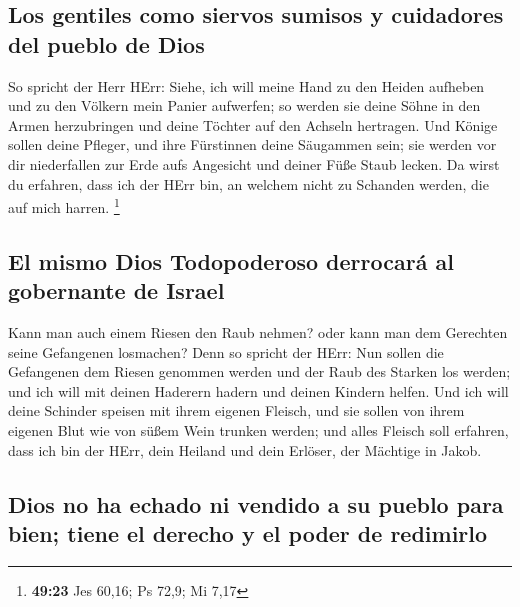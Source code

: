 \hypertarget{los-gentiles-como-siervos-sumisos-y-cuidadores-del-pueblo-de-dios}{%
\subsection{Los gentiles como siervos sumisos y cuidadores del pueblo de
Dios}\label{los-gentiles-como-siervos-sumisos-y-cuidadores-del-pueblo-de-dios}}

 So spricht der Herr HErr: Siehe, ich will meine Hand zu
den Heiden aufheben und zu den Völkern mein Panier aufwerfen; so werden
sie deine Söhne in den Armen herzubringen und deine Töchter auf den
Achseln hertragen.  Und Könige sollen deine Pfleger, und
ihre Fürstinnen deine Säugammen sein; sie werden vor dir niederfallen
zur Erde aufs Angesicht und deiner Füße Staub lecken. Da wirst du
erfahren, dass ich der HErr bin, an welchem nicht zu Schanden werden,
die auf mich harren. \footnote{\textbf{49:23} Jes 60,16; Ps 72,9; Mi
  7,17}

\hypertarget{el-mismo-dios-todopoderoso-derrocaruxe1-al-gobernante-de-israel}{%
\subsection{El mismo Dios Todopoderoso derrocará al gobernante de
Israel}\label{el-mismo-dios-todopoderoso-derrocaruxe1-al-gobernante-de-israel}}

 Kann man auch einem Riesen den Raub nehmen? oder kann
man dem Gerechten seine Gefangenen losmachen?  Denn so
spricht der HErr: Nun sollen die Gefangenen dem Riesen genommen werden
und der Raub des Starken los werden; und ich will mit deinen Haderern
hadern und deinen Kindern helfen.  Und ich will deine
Schinder speisen mit ihrem eigenen Fleisch, und sie sollen von ihrem
eigenen Blut wie von süßem Wein trunken werden; und alles Fleisch soll
erfahren, dass ich bin der HErr, dein Heiland und dein Erlöser, der
Mächtige in Jakob.

\hypertarget{dios-no-ha-echado-ni-vendido-a-su-pueblo-para-bien-tiene-el-derecho-y-el-poder-de-redimirlo}{%
\subsection{Dios no ha echado ni vendido a su pueblo para bien; tiene el
derecho y el poder de
redimirlo}\label{dios-no-ha-echado-ni-vendido-a-su-pueblo-para-bien-tiene-el-derecho-y-el-poder-de-redimirlo}}

